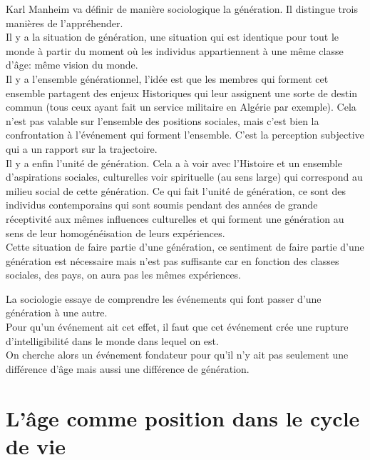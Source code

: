 \documentclass[10pt, a4paper, openany]{book}
\begin{document}
Karl Manheim va définir de manière sociologique la génération. Il distingue trois manières de l'appréhender. \\
Il y a la situation de génération, une situation qui est identique pour tout le monde à partir du moment où les individus appartiennent à une même classe d'âge: même vision du monde. \\
Il y a l'ensemble générationnel, l'idée est que les membres qui forment cet ensemble partagent des enjeux Historiques qui leur assignent une sorte de destin commun (tous ceux ayant fait un service militaire en Algérie par exemple). Cela n'est pas valable sur l'ensemble des positions sociales, mais c'est bien la confrontation à l'événement qui forment l'ensemble. C'est la perception subjective qui a un rapport sur la trajectoire. \\
Il y a enfin l'unité de génération. Cela a à voir avec l'Histoire et un ensemble d'aspirations sociales, culturelles voir spirituelle (au sens large) qui correspond au milieu social de cette génération. Ce qui fait l'unité de génération, ce sont des individus contemporains qui sont soumis pendant des années de grande réceptivité aux mêmes influences culturelles et qui forment une génération au sens de leur homogénéisation de leurs expériences. \\
Cette situation de faire partie d'une génération, ce sentiment de faire partie d'une génération est nécessaire mais n'est pas suffisante car en fonction des classes sociales, des pays, on aura pas les mêmes expériences. 


La sociologie essaye de comprendre les événements qui font passer d'une génération à une autre. \\
Pour qu'un événement ait cet effet, il faut que cet événement crée une rupture d'intelligibilité dans le monde dans lequel on est. \\
On cherche alors un événement fondateur pour qu'il n'y ait pas seulement une différence d'âge mais aussi une différence de génération. 

\section{L'âge comme position dans le cycle de vie}
\end{document}
